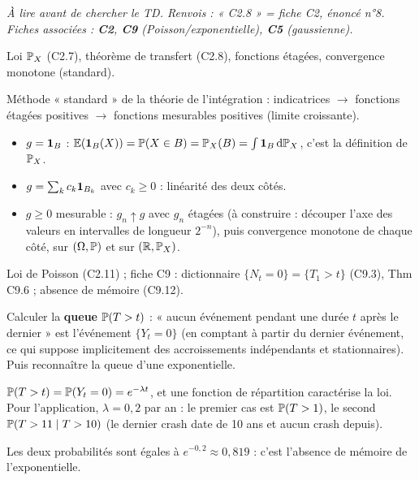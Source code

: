 \documentclass[11pt,a4paper]{article}
\begin{document}

\textit{À lire avant de chercher le TD. Renvois : « C2.8 » = fiche C2, énoncé n°8. Fiches associées : \textbf{C2}, \textbf{C9}
(Poisson/exponentielle), \textbf{C5} (gaussienne).}

\begin{exo}
\outils Loi $\mathbb{P}_X$ (C2.7), théorème de transfert (C2.8), fonctions étagées, convergence monotone (standard).

\meth Méthode « standard » de la théorie de l'intégration : indicatrices $\to$ fonctions étagées positives $\to$ fonctions mesurables
positives (limite croissante).

\indic
\begin{itemize}
  \item $g=\mathbf{1}_B$ : $\mathbb{E}(\mathbf{1}_B(X))=\mathbb{P}(X\in B)=\mathbb{P}_X(B)=\int\mathbf{1}_B\,\mathrm{d}\mathbb{P}_X$, c'est la définition de $\mathbb{P}_X$.
  \item $g=\sum_k c_k\mathbf{1}_{B_k}$ avec $c_k\ge0$ : linéarité des deux côtés.
  \item $g\ge0$ mesurable : $g_n\uparrow g$ avec $g_n$ étagées (à construire : découper l'axe des valeurs en intervalles de longueur $2^{-n}$),
  puis convergence monotone de chaque côté, sur $(\Omega,\mathbb{P})$ et sur $(\mathbb{R},\mathbb{P}_X)$.
\end{itemize}
\end{exo}

\begin{exo}
\outils Loi de Poisson (C2.11) ; fiche C9 : dictionnaire $\{N_t=0\}=\{T_1>t\}$ (C9.3), Thm C9.6 ; absence de mémoire (C9.12).

\meth Calculer la \textbf{queue} $\mathbb{P}(T>t)$ : « aucun événement pendant une durée $t$ après le dernier » est l'événement $\{Y_t=0\}$
(en comptant à partir du dernier événement, ce qui suppose implicitement des accroissements indépendants et stationnaires).
Puis reconnaître la queue d'une exponentielle.

\indic $\mathbb{P}(T>t)=\mathbb{P}(Y_t=0)=e^{-\lambda t}$, et une fonction de répartition caractérise la loi.
Pour l'application, $\lambda=0{,}2$ par an : le premier cas est $\mathbb{P}(T>1)$, le second
$\mathbb{P}(T>11\mid T>10)$ (le dernier crash date de 10 ans et aucun crash depuis).

\rep Les deux probabilités sont égales à $e^{-0{,}2}\approx0{,}819$ : c'est l'absence de mémoire de l'exponentielle.
\end{exo}
\end{document}
